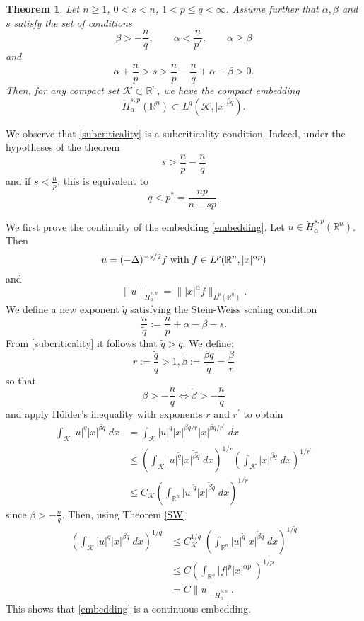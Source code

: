 \documentclass[12pt]{amsart}
\newcommand {\R}{\mathbb{R}}
\newcommand {\be}{\begin{equation}}
\newcommand {\ee}{\end{equation}}
\newtheorem{theorem}{Theorem}[section]
\begin{document}
\begin{theorem}
	\label{teo.compacidad} 
	Let $n\geq 1$, $0 < s< n$, $1 < p \leq  q <\infty$. Assume further that $\alpha, \beta$ and $s$ satisfy the set of conditions 
	\begin{equation}
	\beta > -\frac {n}{q},\qquad \alpha<\frac{n}{p'}, \qquad
	\alpha \geq \beta
	\end{equation}
	and
	\be \alpha + \frac{n}{p} > s> \frac{n}{p}-\frac{n}{q} + \alpha-\beta >0. \label{subcriticality} \ee
	Then, for any compact set $\mathcal{K} \subset \R^n$, we have the compact embedding
	\be \dot{H}^{s,p}_\alpha(\R^n) \subset L^q(\mathcal{K},|x|^{\beta q}). \label{embedding}  \ee
	\label{thm-local-compactness}
\end{theorem}

We observe that \eqref{subcriticality} is a subcriticality condition. Indeed, under the hypotheses 
of the theorem
$$ s> \frac{n}{p}-\frac{n}{q} $$ 
and if $s<\frac{n}{p}$, this is equivalent to
$$ q < p^*= \frac{np}{n-sp}.$$

\medskip

We first prove the continuity of the embedding \eqref{embedding}. Let $u \in \dot{H}^{s,p}_\alpha(\R^n)$. Then
$$ u =(-\Delta)^{-s/2} f  \;  \hbox{with} \; f \in L^p(\R^n,|x|^{\alpha p}) $$
and
$$ \| u \|_{\dot{H}^{s,p}_\alpha} = \| |x|^\alpha f \|_{L^p(\R^n)}.$$
We define a new exponent $\tilde{q}$ satisfying the Stein-Weiss scaling condition
$$  \frac{n}{\tilde{q}} := \frac{n}{p} + \alpha-\beta -s.$$
From \eqref{subcriticality} it follows that $\tilde{q}>q$. We define:
$$ r:= \frac{\tilde{q}}{q}>1, \tilde{\beta}:=  \frac{\beta q}{\tilde{q}} = \frac{\beta}{r}  $$
so that
$$ \beta > -\frac {n}{q} \Leftrightarrow \tilde{\beta}  > -\frac {n}{\tilde{q}} $$
and apply H\"older's inequality with exponents $r$ and $r^\prime$ to obtain
\begin{align*}
\int_{\mathcal{K}} |u|^q |x|^{\beta q} \; dx &= \int_{\mathcal{K}} |u|^q |x|^{\beta q/r} |x|^{\beta q/r^\prime} \; dx \\
&\leq \left( \int_{\mathcal{K}} |u|^{\tilde{q}} |x|^{\tilde{\beta} \tilde{q}} \; dx \right)^{1/r} 
\left( \int_{\mathcal{K}} |x|^{\beta q} \; dx \right)^{1/r^\prime} \\
& \leq C_{\mathcal{K}} \left( \int_{\R^n} |u|^{\tilde{q}} |x|^{\tilde{\beta} \tilde{q}} \; dx \right)^{1/r}
\end{align*}
since $\beta>-\frac{n}{q}$. Then, using Theorem \ref{SW}
\begin{align*}
\left( \int_{\mathcal{K}} |u|^q |x|^{\beta q} \; dx \right)^{1/q} &\leq C_{\mathcal{K}}^{1/q} \; 
\left( \int_{\R^n} |u|^{\tilde{q}} |x|^{\tilde{\beta} \tilde{q}} \; dx \right)^{1/\tilde{q}} \\
&\leq C \left( \int_{\R^n}  |f|^p  |x|^{\alpha p} \; \right)^{1/p} \\
&= C \| u \|_{\dot{H}^{s,p}_\alpha} .
\end{align*}
This shows that \eqref{embedding} is a continuous embedding.
\end{document}
